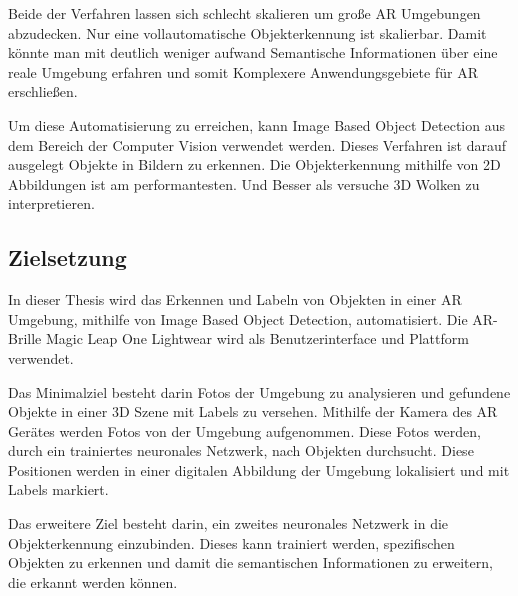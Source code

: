 Beide der Verfahren lassen sich schlecht skalieren um große AR Umgebungen abzudecken. Nur eine vollautomatische Objekterkennung ist skalierbar. Damit könnte man mit deutlich weniger aufwand Semantische Informationen über eine reale Umgebung erfahren und somit Komplexere Anwendungsgebiete für AR erschließen.

Um diese Automatisierung zu erreichen, kann Image Based Object Detection aus dem Bereich der Computer Vision verwendet werden.
Dieses Verfahren ist darauf ausgelegt Objekte in Bildern zu erkennen. Die Objekterkennung mithilfe von 2D Abbildungen ist am performantesten.
Und Besser als versuche 3D Wolken zu interpretieren.\citep{introToCNN}

\subsection{Zielsetzung}

In dieser Thesis wird das Erkennen und Labeln von Objekten in einer AR Umgebung, mithilfe von Image Based Object Detection, automatisiert. 
Die AR-Brille Magic Leap One Lightwear wird als Benutzerinterface und Plattform verwendet.


Das Minimalziel besteht darin Fotos der Umgebung zu analysieren und gefundene Objekte in einer 3D Szene mit Labels zu versehen. 
Mithilfe der Kamera des AR Gerätes werden Fotos von der Umgebung aufgenommen. Diese Fotos werden, durch ein trainiertes neuronales Netzwerk, nach Objekten durchsucht. Diese Positionen werden in einer digitalen Abbildung der Umgebung lokalisiert und mit Labels markiert.

Das erweitere Ziel besteht darin, ein zweites neuronales Netzwerk in die Objekterkennung einzubinden. Dieses kann trainiert werden, spezifischen Objekten zu erkennen und damit die semantischen Informationen zu erweitern, die erkannt werden können.

